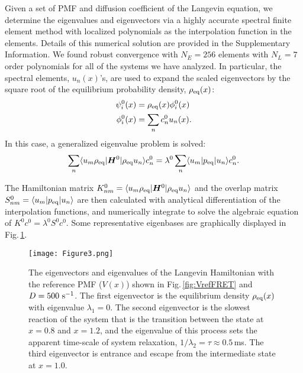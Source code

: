 \documentclass[journal=jpcbfk,manuscript=article,layout=twocolumn,articletitle=true]{achemso}
\begin{document}
Given a set of PMF and diffusion coefficient of the Langevin equation, we determine the eigenvalues and eigenvectors via a highly accurate spectral finite element method with localized polynomials as the interpolation function in the elements. Details of this numerical solution are provided in the Supplementary Information. We found robust convergence with $N_E = 256$ elements with $N_L = 7$ order polynomials for all of the systems we have analyzed. In particular, the spectral elements, $u_n(x)$'s, are used to expand the scaled eigenvectors by the square root of the equilibrium probability density, $\rho_{\rm eq}(x)$:
\begin{align}
\psi^0_i(x) &= \rho_{\rm eq}(x) \phi^0_i(x) \\
\phi^0_i(x) &= \sum_n c^0_n u_n(x).
\end{align}
In this case, a generalized eigenvalue problem is solved:
\begin{align}
\sum_n \langle u_m \rho_{\rm eq} | \bm{H}^0 |  \rho_{\rm eq} u_n \rangle c^0_n = \lambda^0 \sum_n \langle u_m | p_{\rm{eq}} | u_n \rangle c^0_n.
\end{align}

The Hamiltonian matrix $K^0_{nm}=\langle u_m \rho_{\rm eq} | \bm{H}^0 | \rho_{\rm eq} u_n \rangle$ and the overlap matrix $S^0_{nm} =\langle u_m | p_{\rm{eq}} | u_n \rangle$ are then calculated with analytical differentiation of the interpolation functions, and numerically integrate to solve the algebraic equation of $K^0c^0=\lambda^0 S^0c^0$. Some representative eigenbases are graphically displayed in Fig.\,\ref{fig:eigs}. 

\begin{figure}[t]
\texttt{[image: Figure3.png]}
\caption[Eigenvectors of Hamiltonian for 3 well system]{\label{fig:eigs} The eigenvectors and eigenvalues of the Langevin Hamiltonian with the reference PMF ($V(x)$) shown in Fig.\,\ref{fig:VrefFRET} and $D=500~\rm s^{-1}$. The first eigenvector is the equilibrium density $\rho_{\rm{eq}}(x)$ with eigenvalue $\lambda_1=0$. The second eigenvector is the slowest reaction of the system that is the transition between the state at $x=0.8$ and $x=1.2$, and the eigenvalue of this process sets the apparent time-scale of system relaxation, $1/ \lambda_2 = \tau \approx 0.5$\,ms. The third eigenvector is entrance and escape from the intermediate state at $x=1.0$.}
\end{figure}
\end{document}
